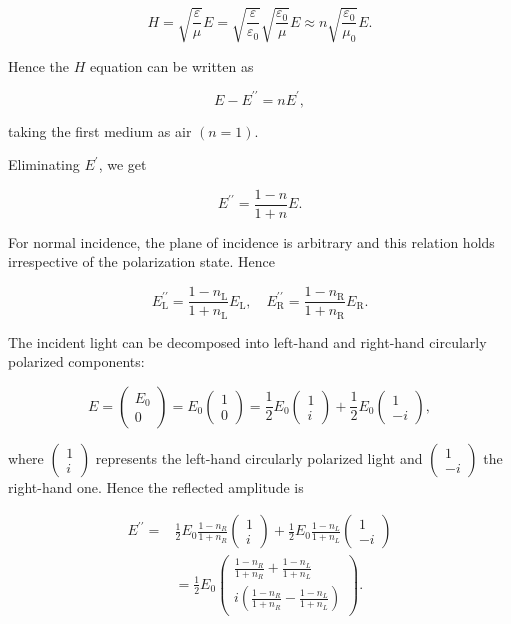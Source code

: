 \documentclass[10pt]{article}
\begin{document}
$$
H=\sqrt{\frac{\varepsilon}{\mu}} E=\sqrt{\frac{\varepsilon}{\varepsilon_{0}}} \sqrt{\frac{\varepsilon_{0}}{\mu}} E \approx n \sqrt{\frac{\varepsilon_{0}}{\mu_{0}}} E .
$$

Hence the $H$ equation can be written as

$$
E-E^{\prime \prime}=n E^{\prime},
$$

taking the first medium as air $(n=1)$.

Eliminating $E^{\prime}$, we get

$$
E^{\prime \prime}=\frac{1-n}{1+n} E .
$$

For normal incidence, the plane of incidence is arbitrary and this relation holds irrespective of the polarization state. Hence

$$
E_{\mathrm{L}}^{\prime \prime}=\frac{1-n_{\mathrm{L}}}{1+n_{\mathrm{L}}} E_{\mathrm{L}}, \quad E_{\mathrm{R}}^{\prime \prime}=\frac{1-n_{\mathrm{R}}}{1+n_{\mathrm{R}}} E_{\mathrm{R}} .
$$

The incident light can be decomposed into left-hand and right-hand circularly polarized components:

$$
E=\left(\begin{array}{c}
E_{0} \\
0
\end{array}\right)=E_{0}\left(\begin{array}{l}
1 \\
0
\end{array}\right)=\frac{1}{2} E_{0}\left(\begin{array}{c}
1 \\
i
\end{array}\right)+\frac{1}{2} E_{0}\left(\begin{array}{c}
1 \\
-i
\end{array}\right),
$$

where $\left(\begin{array}{l}1 \\ i\end{array}\right)$ represents the left-hand circularly polarized light and $\left(\begin{array}{c}1 \\ -i\end{array}\right)$ the right-hand one. Hence the reflected amplitude is

$$
\begin{aligned}
E^{\prime \prime}=& \frac{1}{2} E_{0} \frac{1-n_{R}}{1+n_{R}}\left(\begin{array}{l}
1 \\
i
\end{array}\right)+\frac{1}{2} E_{0} \frac{1-n_{L}}{1+n_{L}}\left(\begin{array}{c}
1 \\
-i
\end{array}\right) \\
&=\frac{1}{2} E_{0}\left(\begin{array}{c}
\frac{1-n_{R}}{1+n_{R}}+\frac{1-n_{L}}{1+n_{L}} \\
i\left(\frac{1-n_{R}}{1+n_{R}}-\frac{1-n_{L}}{1+n_{L}}\right)
\end{array}\right) .
\end{aligned}
$$
\end{document}
